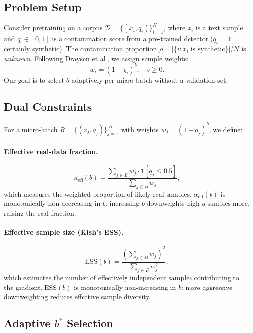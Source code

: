 \documentclass[11pt,a4paper]{article}
\newcommand{\bstar}{b^{*}}
\newcommand{\aeff}{\alpha_{\mathrm{eff}}}
\begin{document}
\subsection{Problem Setup}

Consider pretraining on a corpus $\mathcal{D} = \{(x_i, q_i)\}_{i=1}^{N}$, where $x_i$ is a text sample and $q_i \in [0,1]$ is a contamination score from a pre-trained detector ($q_i = 1$: certainly synthetic).
The contamination proportion $\rho = |\{i : x_i \text{ is synthetic}\}|/N$ is \emph{unknown}.
Following Drayson et al., we assign sample weights:
\begin{equation}
    w_i = (1 - q_i)^b, \quad b \geq 0.
    \label{eq:weight}
\end{equation}
Our goal is to select $b$ adaptively per micro-batch without a validation set.

\subsection{Dual Constraints}

For a micro-batch $B = \{(x_j, q_j)\}_{j=1}^{|B|}$ with weights $w_j = (1-q_j)^b$, we define:

\paragraph{Effective real-data fraction.}
\begin{equation}
    \aeff(b) = \frac{\sum_{j \in B} w_j \cdot \mathbf{1}[q_j \leq 0.5]}{\sum_{j \in B} w_j},
    \label{eq:alpha_eff}
\end{equation}
which measures the weighted proportion of likely-real samples.
$\aeff(b)$ is monotonically non-decreasing in $b$: increasing $b$ downweights high-$q$ samples more, raising the real fraction.

\paragraph{Effective sample size (Kish's ESS).}
\begin{equation}
    \mathrm{ESS}(b) = \frac{\left(\sum_{j \in B} w_j\right)^2}{\sum_{j \in B} w_j^2},
    \label{eq:ess}
\end{equation}
which estimates the number of effectively independent samples contributing to the gradient.
$\mathrm{ESS}(b)$ is monotonically non-increasing in $b$: more aggressive downweighting reduces effective sample diversity.

\subsection{Adaptive $\bstar$ Selection}
\label{sec:bstar}
\end{document}
